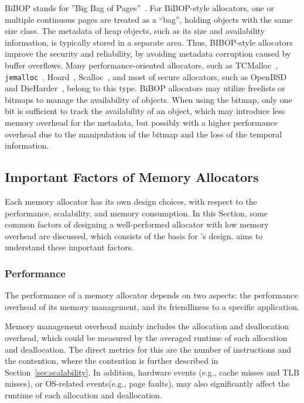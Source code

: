 BiBOP stands for ''Big Bag of Pages''~\cite{hanson1980}. For BiBOP-style allocators, one or multiple continuous pages are treated as a ``bag'', holding objects with the same size class. The metadata of heap objects, such as its size and availability information, is typically stored in a separate area. Thus, BIBOP-style allocators improve the security and reliability, by avoiding metadata corruption caused by buffer overflows. Many performance-oriented allocators, such as TCMalloc~\cite{TCMalloc}, \texttt{jemalloc}~\cite{jemalloc}, Hoard~\cite{Hoard}, Scalloc~\cite{Scalloc}, and most of secure allocators, such as OpenBSD~\cite{OpenBSD} and DieHarder~\cite{DieHarder}, belong to this type. BiBOP allocators may utilize freelists or bitmaps to manage the availability of objects. When using the bitmap, only one bit is sufficient to track the availability of an object, which may introduce less memory overhead for the metadata, but possibly with a higher performance overhead due to the manipulation of the bitmap and the loss of the temporal information.  


\subsection{Important Factors of Memory Allocators}

\label{sec:factors}

Each memory allocator has its own design choices, with respect to the performance, scalability, and memory consumption. In this Section, some common factors of designing a well-performed allocator with low memory overhead are discussed, which consists of the basis for \MP{}'s design. \MP{} aims to understand these important factors. 

\subsubsection{Performance}
\label{sec:performance}

The performance of a memory allocator depends on two aspects: the performance overhead of its memory management, and its friendliness to a specific application. 

Memory management overhead mainly includes the allocation and deallocation overhead, which could be measured by the averaged runtime of each allocation and deallocation. The  direct metrics for this are the number of instructions and the contention, where the contention is further described in Section~\ref{sec:scalability}. In addition, hardware events (e.g., cache misses and TLB misses), or OS-related events(e.g., page faults), may also significantly affect the runtime of each allocation and deallocation. %

